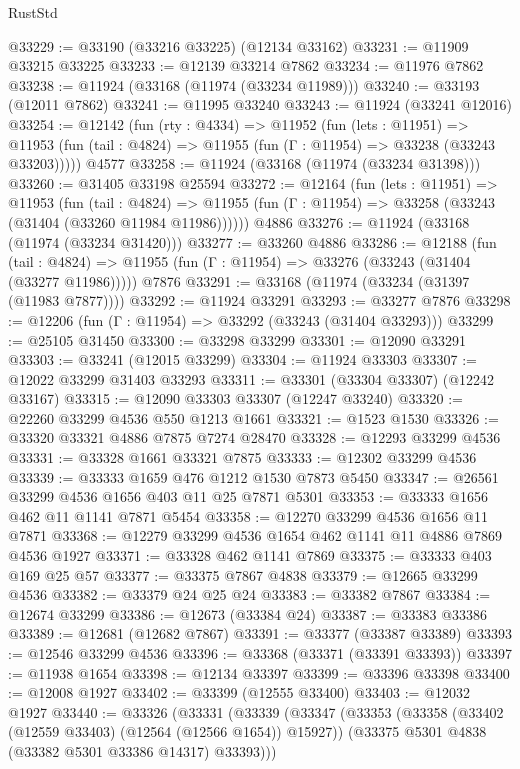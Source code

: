 \begin{lexlean}{RustStd}
\begin{coremodule}
{\begin{coremodule}
{{{{{{{{{{{{{{{{{{{{{{{{{{{{{{{{{{{{{{{{{{{{{{{{{{{{{{{{{{{{{{{{{{{{{{{{{{{{{{{{@33229 := @33190 (@33216 @33225) (@12134 @33162)
@33231 := @11909 @33215 @33225
@33233 := @12139 @33214 @7862
@33234 := @11976 @7862
@33238 := @11924 (@33168 (@11974 (@33234 @11989)))
@33240 := @33193 (@12011 @7862)
@33241 := @11995 @33240
@33243 := @11924 (@33241 @12016)
@33254 := @12142
    (fun (rty : @4334) =>
    @11952
      (fun (lets : @11951) =>
      @11953 (fun (tail : @4824) => @11955 (fun (Γ : @11954) => @33238 (@33243 @33203)))))
    @4577
@33258 := @11924 (@33168 (@11974 (@33234 @31398)))
@33260 := @31405 @33198 @25594
@33272 := @12164
    (fun (lets : @11951) =>
    @11953
      (fun (tail : @4824) =>
      @11955 (fun (Γ : @11954) => @33258 (@33243 (@31404 (@33260 @11984 @11986))))))
    @4886
@33276 := @11924 (@33168 (@11974 (@33234 @31420)))
@33277 := @33260 @4886
@33286 := @12188
    (fun (tail : @4824) => @11955 (fun (Γ : @11954) => @33276 (@33243 (@31404 (@33277 @11986)))))
    @7876
@33291 := @33168 (@11974 (@33234 (@31397 (@11983 @7877))))
@33292 := @11924 @33291
@33293 := @33277 @7876
@33298 := @12206 (fun (Γ : @11954) => @33292 (@33243 (@31404 @33293)))
@33299 := @25105 @31450
@33300 := @33298 @33299
@33301 := @12090 @33291
@33303 := @33241 (@12015 @33299)
@33304 := @11924 @33303
@33307 := @12022 @33299 @31403 @33293
@33311 := @33301 (@33304 @33307) (@12242 @33167)
@33315 := @12090 @33303 @33307 (@12247 @33240)
@33320 := @22260 @33299 @4536 @550 @1213 @1661
@33321 := @1523 @1530
@33326 := @33320 @33321 @4886 @7875 @7274 @28470
@33328 := @12293 @33299 @4536
@33331 := @33328 @1661 @33321 @7875
@33333 := @12302 @33299 @4536
@33339 := @33333 @1659 @476 @1212 @1530 @7873 @5450
@33347 := @26561 @33299 @4536 @1656 @403 @11 @25 @7871 @5301
@33353 := @33333 @1656 @462 @11 @1141 @7871 @5454
@33358 := @12270 @33299 @4536 @1656 @11 @7871
@33368 := @12279 @33299 @4536 @1654 @462 @1141 @11 @4886 @7869 @4536 @1927
@33371 := @33328 @462 @1141 @7869
@33375 := @33333 @403 @169 @25 @57
@33377 := @33375 @7867 @4838
@33379 := @12665 @33299 @4536
@33382 := @33379 @24 @25 @24
@33383 := @33382 @7867
@33384 := @12674 @33299
@33386 := @12673 (@33384 @24)
@33387 := @33383 @33386
@33389 := @12681 (@12682 @7867)
@33391 := @33377 (@33387 @33389)
@33393 := @12546 @33299 @4536
@33396 := @33368 (@33371 (@33391 @33393))
@33397 := @11938 @1654
@33398 := @12134 @33397
@33399 := @33396 @33398
@33400 := @12008 @1927
@33402 := @33399 (@12555 @33400)
@33403 := @12032 @1927
@33440 := @33326
    (@33331
      (@33339
        (@33347
          (@33353
            (@33358 (@33402 (@12559 @33403) (@12564 (@12566 @1654)) @15927))
            (@33375 @5301 @4838 (@33382 @5301 @33386 @14317) @33393)))
}}}}}}}}}}}}}}}}}}}}}}}}}}}}}}}}}}}}}}}}}}}}}}}}}}}}}}}}}}}}}}}}}}}}}}}}}}}}}}}}
\end{coremodule}}
\end{coremodule}
\end{lexlean}

